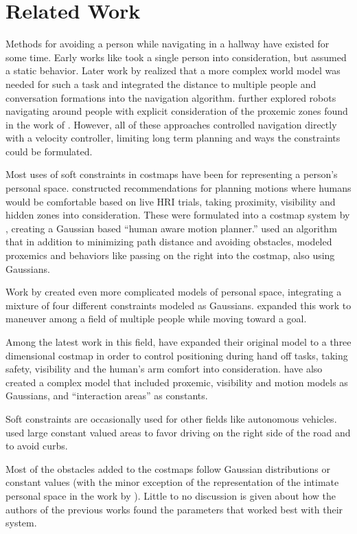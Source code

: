 \section{Related Work}
Methods for avoiding a person while navigating in a hallway have existed for some time. Early works like \citet{yoda1997} took a single person into consideration, but assumed a static behavior. Later work by \citet{christensen2004} realized that a more complex world model was needed for such a task and integrated the distance to multiple people and conversation formations into the navigation algorithm. 
\citet{christensen2005} further explored robots navigating around people with explicit consideration of the proxemic zones found in the work of \citet{hall1969}. However, all of these approaches controlled navigation directly with a velocity controller, limiting long term planning and ways the constraints could be formulated. 

Most uses of soft constraints in costmaps have been for representing a person's personal space. \citet{dautenhahn:serveseated} %
constructed recommendations for planning motions where humans would be comfortable based on live HRI trials, taking proximity, visibility and hidden zones into consideration. These were formulated into a costmap system by \citet{sisbot2007}, creating a Gaussian based ``human aware motion planner.'' 
\citet{kirby:companion} used an algorithm that in addition to minimizing path distance and avoiding obstacles, modeled proxemics and behaviors like passing on the right into the costmap, also using Gaussians. 

Work by \citet{svenstrup2009}\cite{svenstrup2010} created even more complicated models of personal space, integrating a mixture of four different constraints modeled as Gaussians.  expanded this work to maneuver among a field of multiple people while moving toward a goal. 

Among the latest work in this field, \citet{sisbot2011} have expanded their original model to a three dimensional costmap in order to control positioning during hand off tasks, taking safety, visibility and the human's arm comfort into consideration. \citet{fraichard:anthronav} have also created a complex model that included proxemic, visibility and motion models as Gaussians, and ``interaction areas'' as constants. 

Soft constraints are occasionally used for other fields like autonomous vehicles. \citet{likhachev:costmaps} used large constant valued areas to favor driving on the right side of the road and to avoid curbs. 

Most of the obstacles added to the costmaps follow Gaussian distributions or constant values (with the minor exception of the representation of the intimate personal space in the work by \citet{fraichard:anthronav}). Little to no discussion is given about how the authors of the previous works found the parameters that worked best with their system. 








